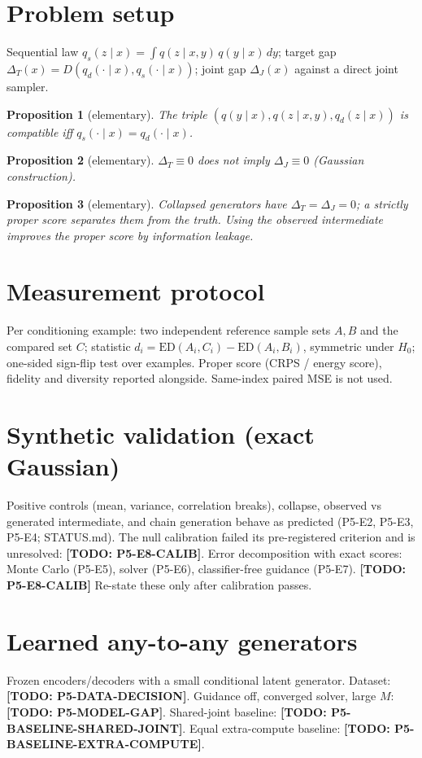 \documentclass{article}
\newcommand{\todo}[1]{\textbf{[TODO: #1]}}
\newtheorem{proposition}{Proposition}
\begin{document}
\section{Problem setup}
Sequential law $q_s(z\mid x)=\int q(z\mid x,y)\,q(y\mid x)\,dy$;
target gap $\Delta_T(x)=D(q_d(\cdot\mid x),q_s(\cdot\mid x))$;
joint gap $\Delta_J(x)$ against a direct joint sampler.

\begin{proposition}[elementary]
The triple $(q(y\mid x), q(z\mid x,y), q_d(z\mid x))$ is compatible iff
$q_s(\cdot\mid x)=q_d(\cdot\mid x)$.
\end{proposition}
\begin{proposition}[elementary]
$\Delta_T\equiv 0$ does not imply $\Delta_J\equiv 0$ (Gaussian construction).
\end{proposition}
\begin{proposition}[elementary]
Collapsed generators have $\Delta_T=\Delta_J=0$; a strictly proper score
separates them from the truth. Using the observed intermediate improves the
proper score by information leakage.
\end{proposition}

\section{Measurement protocol}
Per conditioning example: two independent reference sample sets $A,B$ and the
compared set $C$; statistic $d_i=\mathrm{ED}(A_i,C_i)-\mathrm{ED}(A_i,B_i)$,
symmetric under $H_0$; one-sided sign-flip test over examples. Proper score
(CRPS / energy score), fidelity and diversity reported alongside. Same-index
paired MSE is not used.

\section{Synthetic validation (exact Gaussian)}
Positive controls (mean, variance, correlation breaks), collapse, observed vs
generated intermediate, and chain generation behave as predicted
(P5-E2, P5-E3, P5-E4; STATUS.md). The null calibration failed its
pre-registered criterion and is unresolved: \todo{P5-E8-CALIB}.
Error decomposition with exact scores: Monte Carlo (P5-E5), solver (P5-E6),
classifier-free guidance (P5-E7). \todo{P5-E8-CALIB} Re-state these only
after calibration passes.

\section{Learned any-to-any generators}
Frozen encoders/decoders with a small conditional latent generator.
Dataset: \todo{P5-DATA-DECISION}.
Guidance off, converged solver, large $M$: \todo{P5-MODEL-GAP}.
Shared-joint baseline: \todo{P5-BASELINE-SHARED-JOINT}.
Equal extra-compute baseline: \todo{P5-BASELINE-EXTRA-COMPUTE}.
\end{document}

